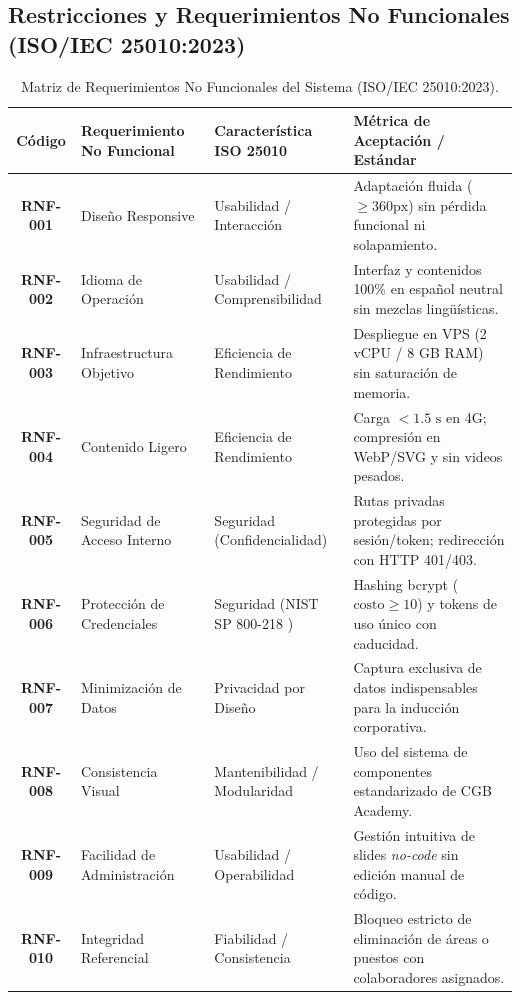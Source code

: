 \documentclass[11pt,a4paper]{article}
\begin{document}
\subsection{Restricciones y Requerimientos No Funcionales (ISO/IEC 25010:2023)}
\begin{table}[H]
\centering
\scriptsize
\renewcommand{\arraystretch}{1.2}
\begin{tabularx}{\linewidth}{|c|>{\raggedright\arraybackslash}p{3.2cm}|>{\raggedright\arraybackslash}p{3.5cm}|>{\raggedright\arraybackslash}X|}
\hline
\rowcolor{gray!15}
\textbf{Código} & \textbf{Requerimiento No Funcional} & \textbf{Característica ISO 25010} & \textbf{Métrica de Aceptación / Estándar} \\
\hline
\textbf{RNF-001} & Diseño Responsive & Usabilidad / Interacción & Adaptación fluida ($\ge 360\text{px}$) sin pérdida funcional ni solapamiento. \\
\hline
\textbf{RNF-002} & Idioma de Operación & Usabilidad / Comprensibilidad & Interfaz y contenidos 100\% en español neutral sin mezclas lingüísticas. \\
\hline
\textbf{RNF-003} & Infraestructura Objetivo & Eficiencia de Rendimiento & Despliegue en VPS (2 vCPU / 8 GB RAM) sin saturación de memoria. \\
\hline
\textbf{RNF-004} & Contenido Ligero & Eficiencia de Rendimiento & Carga $< 1.5\text{ s}$ en 4G; compresión en WebP/SVG y sin videos pesados. \\
\hline
\textbf{RNF-005} & Seguridad de Acceso Interno & Seguridad (Confidencialidad) & Rutas privadas protegidas por sesión/token; redirección con HTTP 401/403. \\
\hline
\textbf{RNF-006} & Protección de Credenciales & Seguridad (NIST SP 800-218 \cite{nist2022}) & Hashing bcrypt ($\text{costo} \ge 10$) y tokens de uso único con caducidad. \\
\hline
\textbf{RNF-007} & Minimización de Datos & Privacidad por Diseño & Captura exclusiva de datos indispensables para la inducción corporativa. \\
\hline
\textbf{RNF-008} & Consistencia Visual & Mantenibilidad / Modularidad & Uso del sistema de componentes estandarizado de CGB Academy. \\
\hline
\textbf{RNF-009} & Facilidad de Administración & Usabilidad / Operabilidad & Gestión intuitiva de slides \textit{no-code} sin edición manual de código. \\
\hline
\textbf{RNF-010} & Integridad Referencial & Fiabilidad / Consistencia & Bloqueo estricto de eliminación de áreas o puestos con colaboradores asignados. \\
\hline
\end{tabularx}
\caption{Matriz de Requerimientos No Funcionales del Sistema (ISO/IEC 25010:2023).}
\end{table}
\end{document}
